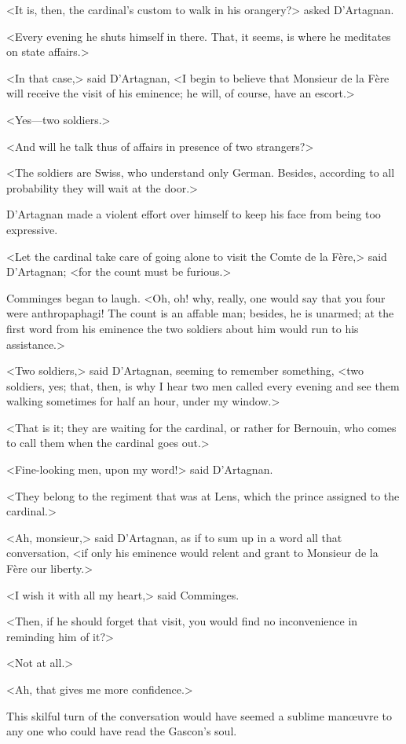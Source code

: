 <It is, then, the cardinal's custom to walk in his orangery?> asked D'Artagnan.

<Every evening he shuts himself in there. That, it seems, is where he meditates on state affairs.>

<In that case,> said D'Artagnan, <I begin to believe that Monsieur de la Fère will receive the visit of his eminence; he will, of course, have an escort.>

<Yes—two soldiers.>

<And will he talk thus of affairs in presence of two strangers?>

<The soldiers are Swiss, who understand only German. Besides, according to all probability they will wait at the door.>

D'Artagnan made a violent effort over himself to keep his face from being too expressive.

<Let the cardinal take care of going alone to visit the Comte de la Fère,> said D'Artagnan; <for the count must be furious.>

Comminges began to laugh. <Oh, oh! why, really, one would say that you four were anthropaphagi! The count is an affable man; besides, he is unarmed; at the first word from his eminence the two soldiers about him would run to his assistance.>

<Two soldiers,> said D'Artagnan, seeming to remember something, <two soldiers, yes; that, then, is why I hear two men called every evening and see them walking sometimes for half an hour, under my window.>

<That is it; they are waiting for the cardinal, or rather for Bernouin, who comes to call them when the cardinal goes out.>

<Fine-looking men, upon my word!> said D'Artagnan.

<They belong to the regiment that was at Lens, which the prince assigned to the cardinal.>

<Ah, monsieur,> said D'Artagnan, as if to sum up in a word all that conversation, <if only his eminence would relent and grant to Monsieur de la Fère our liberty.>

<I wish it with all my heart,> said Comminges.

<Then, if he should forget that visit, you would find no inconvenience in reminding him of it?>

<Not at all.>

<Ah, that gives me more confidence.>

This skilful turn of the conversation would have seemed a sublime manœuvre to any one who could have read the Gascon's soul.

